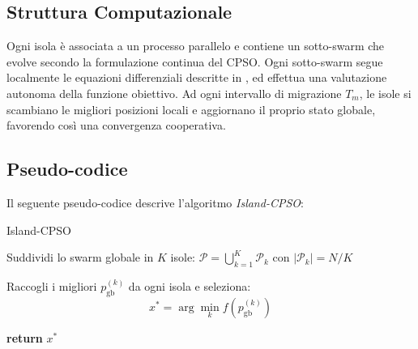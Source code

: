 \documentclass{article}
\begin{document}
\subsection{Struttura Computazionale}

Ogni isola è associata a un processo parallelo e contiene un sotto-swarm che evolve secondo la 
formulazione continua del CPSO. Ogni sotto-swarm segue localmente le equazioni differenziali descritte 
in \cite{professoressa}, ed effettua una valutazione autonoma della funzione obiettivo. Ad ogni 
intervallo di migrazione $T_m$, le isole si scambiano le migliori posizioni locali e aggiornano il 
proprio stato globale, favorendo così una convergenza cooperativa.

\subsection{Pseudo-codice}

Il seguente pseudo-codice descrive l’algoritmo \textit{Island-CPSO}:

\begin{algorithm}[H]
\caption{Island-CPSO}

Suddividi lo swarm globale in $K$ isole: $\mathcal{P} = \bigcup_{k=1}^K \mathcal{P}_k$ con $|\mathcal{P}_k| = N/K$\\


Raccogli i migliori $p_{\text{gb}}^{(k)}$ da ogni isola e seleziona:
\[
x^\ast = \arg\min_{k} f(p_{\text{gb}}^{(k)})
\]

\textbf{return} $x^\ast$
\end{algorithm}
\end{document}
